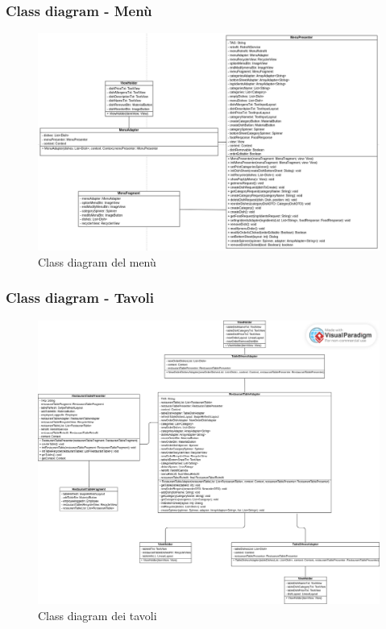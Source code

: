 \subsubsection{Class diagram - Menù}
\begin{figure}[H]
  \centering
  \includegraphics[scale=0.5]{img/class_diagrams_design/menu.png}
  \caption{Class diagram del menù}
\end{figure}
\newpage

\subsubsection{Class diagram - Tavoli}
\begin{figure}[H]
  \centering
  \includegraphics[scale=0.28]{img/class_diagrams_design/Tavoli.png}
  \caption{Class diagram dei tavoli}
\end{figure}
\newpage
